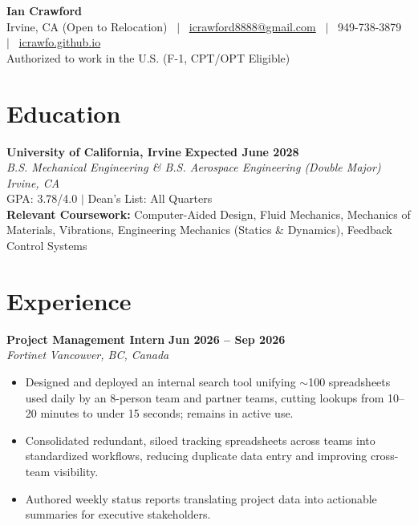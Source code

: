 \documentclass[10.5pt,letterpaper]{article}
\newenvironment{tightitemize}{%
  \begin{itemize}[leftmargin=13pt, itemsep=0pt, topsep=1pt, parsep=0pt, partopsep=0pt]
}{\end{itemize}}
\newcommand{\entry}[4]{%
  \textbf{#1} \hfill \textbf{#2}\\
  \textit{#3} \hfill \textit{#4}\\[-3pt]
}
\begin{document}
\begin{center}
  {\LARGE \textbf{Ian Crawford}}\\[3pt]
  Irvine, CA (Open to Relocation) ~$\vert$~
  \href{mailto:icrawford8888@gmail.com}{icrawford8888@gmail.com} ~$\vert$~
  949-738-3879 ~$\vert$~
  \href{https://icrawfo.github.io}{icrawfo.github.io} \\[2pt]
  \small Authorized to work in the U.S. (F-1, CPT/OPT Eligible)
\end{center}
\vspace{-10pt}

\section{Education}
\entry{University of California, Irvine}{Expected June 2028}{B.S. Mechanical Engineering \& B.S. Aerospace Engineering (Double Major)}{Irvine, CA}
GPA: 3.78/4.0 \quad $\vert$ \quad Dean's List: All Quarters\\
\textbf{Relevant Coursework:} Computer-Aided Design, Fluid Mechanics, Mechanics of Materials, Vibrations, Engineering Mechanics (Statics \& Dynamics), Feedback Control Systems

\section{Experience}

\entry{Project Management Intern}{Jun 2026 -- Sep 2026}{Fortinet}{Vancouver, BC, Canada}
\begin{tightitemize}
  \item Designed and deployed an internal search tool unifying $\sim$100 spreadsheets used daily by an 8-person team and partner teams, cutting lookups from 10--20 minutes to under 15 seconds; remains in active use.
  \item Consolidated redundant, siloed tracking spreadsheets across teams into standardized workflows, reducing duplicate data entry and improving cross-team visibility.
  \item Authored weekly status reports translating project data into actionable summaries for executive stakeholders.
\end{tightitemize}
\end{document}
